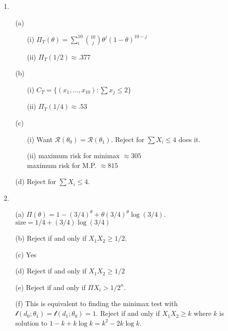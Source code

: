\begin{enumerate}
	\item[1.] \begin{enumerate}
		\item[(a)] \begin{enumerate}
			\item[(i)] $\Pi_\Upsilon(\theta) = \sum\limits_{i}^{10}{10\choose j}\theta^j(1-\theta)^{10-j}$
			\item[(ii)] $\Pi_\Upsilon(1/2)\approx .377$
		\end{enumerate}
		\item[(b)] \begin{enumerate}
			\item[(i)] $C_\Upsilon = \{(x_1,\ldots,x_{10})\colon \sum x_j \le 2\}$
			\item[(ii)] $\Pi_\Upsilon(1/4) \approx .53$
		\end{enumerate}
		\item[(c)] \begin{enumerate}
			\item[(i)] Want $\mathcal{R}(\theta_0) = \mathcal{R}(\theta_1)$. Reject for $\sum X_i \le 4$ does it.
			\item[(ii)] maximum risk for minimax $\approx 305$ \\
						maximum risk for M.P. $\approx 815$
		\end{enumerate}
		\item[(d)] Reject for $\sum X_i \le 4$.
	\end{enumerate}
	
	\item[2.] \begin{enumerate}
		\item[(a)] $\Pi(\theta) = 1 - (3/4)^\theta + \theta(3/4)^\theta\log(3/4)$. \\
					$\mbox{size} = 1/4 + (3/4)\log(3/4)$
		\item[(b)] Reject if and only if $X_1X_2 \ge 1/2$.
		\item[(c)] Yes
		\item[(d)] Reject if and only if $X_1X_2 \ge 1/2$
		\item[(e)] Reject if and only if $\Pi X_i > 1/2^n$.
		\item[(f)] This is equivalent to finding the minimax test with $\mathscr{l}(d_0;\theta_1) = \mathscr{l}(d_1;\theta_0) = 1$. Reject if and only if $X_1X_2 \ge k$ where $k$ is solution to $1-k+k\log k = k^2-2k\log k$.
	\end{enumerate}


\end{enumerate}
